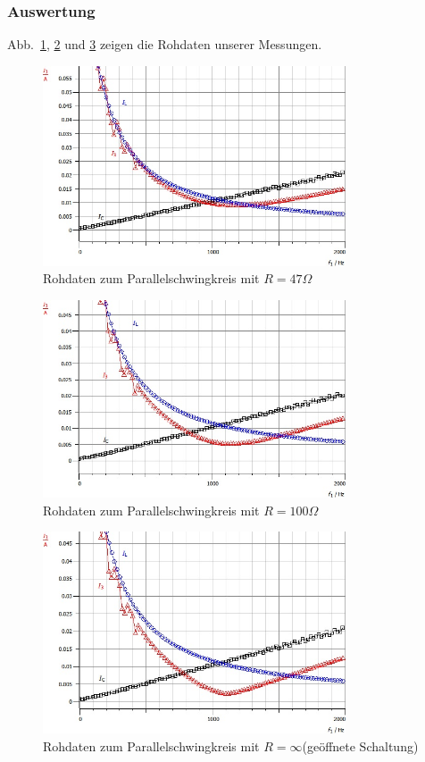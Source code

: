 \documentclass[12pt,a4paper]{article}
\begin{document}
\subsubsection{Auswertung}
Abb.~\ref{Rohdaten_P47}, \ref{Rohdaten_P100} und \ref{Rohdaten_Pinf} zeigen die Rohdaten unserer Messungen.
\begin{figure}[H]
	\centering
	\includegraphics[width=0.8\textwidth]{Daten/P47Ohm_Rohdaten_I.jpg}
	\caption{Rohdaten zum Parallelschwingkreis mit $R=47\Omega$}
	\label{Rohdaten_P47}
\end{figure}
\begin{figure}[H]
	\centering
	\includegraphics[width=0.8\textwidth]{Daten/P100Ohm_Rohdaten_I.jpg}
	\caption{Rohdaten zum Parallelschwingkreis mit $R=100\Omega$}
	\label{Rohdaten_P100}
\end{figure}
\begin{figure}[H]
	\centering
	\includegraphics[width=0.8\textwidth]{Daten/PinfOhm_Rohdaten_I.jpg}
	\caption{Rohdaten zum Parallelschwingkreis mit $R=\infty$(geöffnete Schaltung)}
	\label{Rohdaten_Pinf}
\end{figure}
\end{document}
